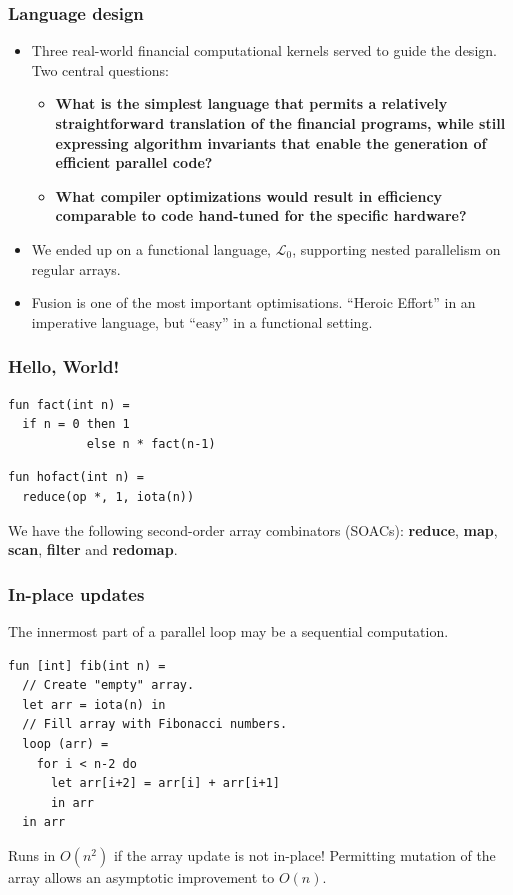 \documentclass{beamer}
\newcommand{\LO}{$\mathcal{L}_0$}
\begin{document}
\begin{frame}
  \frametitle{Language design}

  \begin{itemize}
  \item Three real-world financial computational kernels served to
    guide the design.  Two central questions:
    \begin{itemize}
    \item \textbf{What is the simplest language that permits a
        relatively straightforward translation of the financial
        programs, while still expressing algorithm invariants that
        enable the generation of efficient parallel code?}
    \item \textbf{What compiler optimizations would result in efficiency
        comparable to code hand-tuned for the specific hardware?}
    \end{itemize}
  \item We ended up on a functional language, \LO{}, supporting nested
    parallelism on regular arrays.
  \item Fusion is one of the most important optimisations.  ``Heroic
    Effort'' in an imperative language, but ``easy'' in a functional
    setting.
  \end{itemize}
\end{frame}

\begin{frame}[fragile]
  \frametitle{Hello, World!}

  \begin{lstlisting}
fun fact(int n) =
  if n = 0 then 1
           else n * fact(n-1)
\end{lstlisting}

\begin{lstlisting}
fun hofact(int n) =
  reduce(op *, 1, iota(n))
\end{lstlisting}

We have the following second-order array combinators (SOACs):
\textbf{reduce}, \textbf{map}, \textbf{scan}, \textbf{filter} and
\textbf{redomap}.

\end{frame}

\begin{frame}[fragile]
  \frametitle{In-place updates}

  The innermost part of a parallel loop may be a sequential
  computation.

  \begin{lstlisting}
fun [int] fib(int n) =
  // Create "empty" array.
  let arr = iota(n) in
  // Fill array with Fibonacci numbers.
  loop (arr) =
    for i < n-2 do
      let arr[i+2] = arr[i] + arr[i+1]
      in arr
  in arr
\end{lstlisting}

Runs in $O(n^{2})$ if the array update is not in-place!  Permitting
mutation of the array allows an asymptotic improvement to $O(n)$.

\end{frame}
\end{document}
